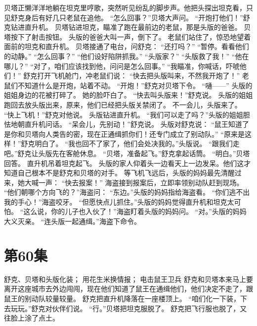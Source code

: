 \documentclass[a4paper,12pt,UTF8,twoside]{ctexbook}
\begin{document}
        贝塔正懒洋洋地躺在坦克里哼歌，突然听见纷乱的脚步声。他把头探出坦克看，只见舒克身后有好几只老鼠在追他。 
        “怎么回事？”贝塔大声问。 
        “开炮打他们！”舒克钻进直升机。 
        贝塔钻进坦克，瞄准了跑在最前边的老鼠，那是头版的爸爸。 
        贝塔按下了射击按钮。 
        头版的爸爸大叫一声，倒下了。 
        老鼠们站住了，惊恐地望着面前的坦克和直升机。 
        贝塔接通了电台，问舒克： 
        “还打吗？” 
        “暂停。看看他们的动静。” 
        “怎么回事？” 
        “他们设好陷阱抓我。” 
        “头版家？” 
        “头版救了我！” 
        “他在哪儿？” 
        “对了，咱们应该找到他，问问是怎么回事。” 
        “我瞄准，你喊话，吓唬他们！” 
        舒克打开飞机舱门，冲老鼠们说： 
        “快去把头版叫来，不然我开炮了！” 
        老鼠们不知道什么是开炮，站着不动。 
        “开炮！”舒克对贝塔下令。 
        “嗵——” 
        头版的姐姐身边的花被打碎了。 
        她的脸吓白了。 
        “快去叫头版来！”舒克说。 
        头版的姐姐跑回去放头版出来，原来，他们已经把头版关禁闭了。 
        不一会儿，头版来了。 
        “快上飞机！”舒克对他说。 
        头版钻进直升机。 
        “我们可以走了吗？”头版的姐姐胆怯地朝直升机问话。 
        “呆会儿，先别动！”舒克说。 
        头版对舒克说： 
        “鼠王知道了是你和贝塔向人类告的密，现在正通缉抓你们！还专门成立了别动队。” 
        “原来是这样！”舒克明白了。 
        “我也回不了家了，他们会处决我的。”头版说。 
        “跟我们走吧。”舒克让头版先在客舱休息。 
        “贝塔，准备起飞。”舒克拿起话筒。 
        “明白。”贝塔回答。 
        直升机吊着坦克起飞。 
        头版的家人仰着头一边看天上一边发呆。他们这才知道自己根本不是舒克和贝塔的对手。 
        等飞机飞远后，头版的妈妈最先清醒过来，她大喊一声： 
        “快去报案！” 
        海盗接到报案后，立即率领别动队赶到现场。 
        “他们朝哪个方向飞的？”海盗问： 
        “东边。”头版的妈妈指给海盗看。 
        “你们逃不出我的手心！”海盗咬牙。 
        “但愿快点儿抓住。”头版的妈妈觉得直升机和坦克太可怕。 
        “这么说，你的儿子也入伙了！”海盗盯着头版的妈妈问。 
        “对。”头版的妈妈大义灭亲。 
        “连头版一起通缉。”海盗下命令。   \chapter{第60集} 
        舒克、贝塔和头版化装； 
        用花生米换情报； 
        电击鼠王卫兵   
        舒克和贝塔本来马上要离开这座城市去外边闯闯，现在他们知道了鼠王在通缉他们，他们决定不走了，跟鼠王的别动队较量较量。 
        舒克把直升机降落在一座楼顶上。 
        “咱们化一下装，下去玩玩。”舒克对伙伴们说。 
        “行。”贝塔把坦克服脱了。 
        舒克把飞行服也脱了，又往脸上涂了点土。 
\end{document}

